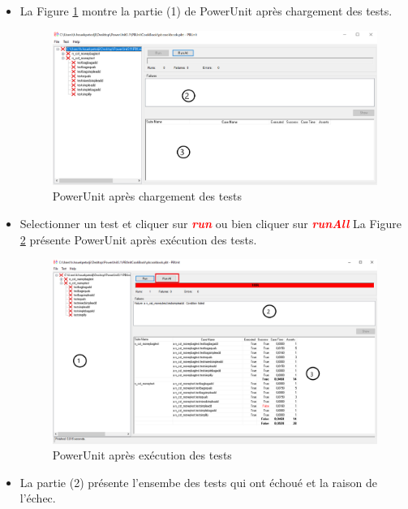 \documentclass[french]{article}
\theoremstyle{definition}
\begin{document}
\begin{itemize}
  \item  La Figure \ref{fig:afterloadTarget} montre la partie (1) de PowerUnit après chargement des tests.
  \begin{figure}[!htbp]
    \begin{center}
    \includegraphics[width=1\linewidth]{./afterloadTarget.png}
    \caption{PowerUnit après chargement des tests}
    \label{fig:afterloadTarget}
    \end{center}
  \end{figure}
  \item  Selectionner un test et cliquer sur \textit{\textbf{\textcolor{red}{run}}} ou bien cliquer sur \textit{\textbf{\textcolor{red}{runAll}}}
 La Figure \ref{fig:powerUnitTestRunned} présente PowerUnit après exécution des tests.
  \begin{figure}[!htbp]
    \begin{center}
    \includegraphics[width=1\linewidth]{./powerUnitTestRunned.png}
    \caption{PowerUnit après exécution des tests}
    \label{fig:powerUnitTestRunned}
    \end{center}
  \end{figure}
  \item  La partie (2) présente l'ensembe des tests qui ont échoué et la raison de l'échec.

\end{itemize}
\end{document}

